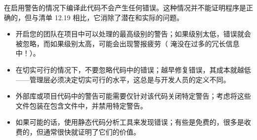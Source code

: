 在启用警告的情况下编译此代码不会产生任何错误。这种情况并不能证明程序是正确的，但与清单 12.19 相比，它消除了潜在和实际的问题。


\begin{itemize}
\item
开启您的团队在项目中可以处理的最高级别的警告；如果级别太低，错误就会被忽略，而如果级别太高，可能会出现警报疲劳（ 淹没在过多的冗长信息中！）。

\item
在切实可行的情况下，不要忽略代码中的错误；越早修复错误，其成本就越低——管理层必须决定切实可行的水平，这总是与开发人员的定义不同。

\item
外部库或项目代码中的警告可能需要仅针对该代码关闭特定警告；考虑将这些文件包装在包含文件中，并禁用特定警告。

\item
如果可能的话，使用静态代码分析工具来发现错误；有些是免费的，很多是收费的，但通常很快就证明了它们的价值。
\end{itemize}
